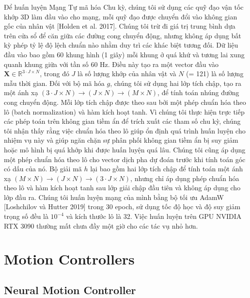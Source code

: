 Để huấn luyện Mạng Tự mã hóa Chu kỳ, chúng tôi sử dụng các quỹ đạo vận tốc khớp 3D làm đầu vào cho mạng, mỗi quỹ đạo được chuyển đổi vào không gian gốc của nhân vật [Holden et al. 2017]. Chúng tôi trừ đi giá trị trung bình dựa trên cửa sổ để căn giữa các đường cong chuyển động, nhưng không áp dụng bất kỳ phép tỷ lệ độ lệch chuẩn nào nhằm duy trì các khác biệt tương đối. Dữ liệu đầu vào bao gồm 60 khung hình (1 giây) mỗi khung ở quá khứ và tương lai xung quanh khung giữa với tần số 60 Hz. Điều này tạo ra một vector đầu vào $\textbf{X} \in \mathbb{R}^{3 \cdot J \times N}$, trong đó $J$ là số lượng khớp của nhân vật và $N$ (= 121) là số lượng mẫu thời gian.
Đối với bộ mã hóa $g$, chúng tôi sử dụng hai lớp tích chập, tạo ra một ánh xạ $(3 \cdot J \times N) \to (J \times N) \to (M \times N)$, để tính toán nhúng đường cong chuyển động. Mỗi lớp tích chập được theo sau bởi một phép chuẩn hóa theo lô (batch normalization) và hàm kích hoạt tanh. Vì chúng tôi thực hiện trực tiếp các phép toán trên không gian tiềm ẩn để trích xuất các tham số chu kỳ, chúng tôi nhận thấy rằng việc chuẩn hóa theo lô giúp ổn định quá trình huấn luyện cho nhiệm vụ này và giúp ngăn chặn sự phân phối không gian tiềm ẩn bị suy giảm hoặc mô hình bị quá khớp khi được huấn luyện quá lâu. Chúng tôi cũng áp dụng một phép chuẩn hóa theo lô cho vector dịch pha dự đoán trước khi tính toán góc có dấu của nó. Bộ giải mã $h$ lại bao gồm hai lớp tích chập để tính toán một ánh xạ $(M \times N) \to (J \times N) \to (3 \cdot J \times N)$, nhưng chỉ áp dụng phép chuẩn hóa theo lô và hàm kích hoạt tanh sau lớp giải chập đầu tiên và không áp dụng cho lớp đầu ra. Chúng tôi huấn luyện mạng của mình bằng bộ tối ưu AdamW [Loshchilov và Hutter 2019] trong 30 epoch, sử dụng tốc độ học và độ suy giảm trọng số đều là $10^{-4}$ và kích thước lô là 32. Việc huấn luyện trên GPU NVIDIA RTX 3090 thường mất chưa đầy một giờ cho các tác vụ nhỏ hơn.


\section{Motion Controllers}
\label{MotionControllers}

\subsection{Neural Motion Controller}

